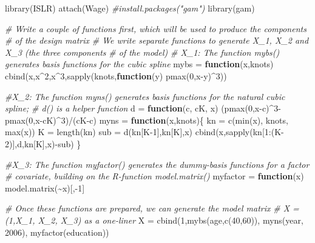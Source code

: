 \documentclass[
]{article}
\newenvironment{Shaded}{\begin{snugshade}}{\end{snugshade}}
\newcommand{\CommentTok}[1]{\textcolor[rgb]{0.56,0.35,0.01}{\textit{#1}}}
\newcommand{\ControlFlowTok}[1]{\textcolor[rgb]{0.13,0.29,0.53}{\textbf{#1}}}
\newcommand{\DecValTok}[1]{\textcolor[rgb]{0.00,0.00,0.81}{#1}}
\newcommand{\FunctionTok}[1]{\textcolor[rgb]{0.00,0.00,0.00}{#1}}
\newcommand{\NormalTok}[1]{#1}
\newcommand{\OtherTok}[1]{\textcolor[rgb]{0.56,0.35,0.01}{#1}}
\newcommand{\SpecialCharTok}[1]{\textcolor[rgb]{0.00,0.00,0.00}{#1}}
\begin{document}
\begin{Shaded}
\begin{Highlighting}[]
\FunctionTok{library}\NormalTok{(ISLR)}
\FunctionTok{attach}\NormalTok{(Wage)}
\CommentTok{\#install.packages("gam")}
\FunctionTok{library}\NormalTok{(gam)}

\CommentTok{\# Write a couple of functions first, which will be used to produce the components }
\CommentTok{\# of the design matrix}
\CommentTok{\# We write separate functions to generate X\_1, X\_2 and X\_3 (the three components }
\CommentTok{\# of the model)}
\CommentTok{\# X\_1: The function mybs() generates basis functions for the cubic spline}
\NormalTok{mybs }\OtherTok{=} \ControlFlowTok{function}\NormalTok{(x,knots) }\FunctionTok{cbind}\NormalTok{(x,x}\SpecialCharTok{\^{}}\DecValTok{2}\NormalTok{,x}\SpecialCharTok{\^{}}\DecValTok{3}\NormalTok{,}\FunctionTok{sapply}\NormalTok{(knots,}\ControlFlowTok{function}\NormalTok{(y) }\FunctionTok{pmax}\NormalTok{(}\DecValTok{0}\NormalTok{,x}\SpecialCharTok{{-}}\NormalTok{y)}\SpecialCharTok{\^{}}\DecValTok{3}\NormalTok{))}

\CommentTok{\#X\_2: The function myns() generates basis functions for the natural cubic spline;}
\CommentTok{\# d() is a helper function}
\NormalTok{d }\OtherTok{=} \ControlFlowTok{function}\NormalTok{(c, cK, x) (}\FunctionTok{pmax}\NormalTok{(}\DecValTok{0}\NormalTok{,x}\SpecialCharTok{{-}}\NormalTok{c)}\SpecialCharTok{\^{}}\DecValTok{3}\SpecialCharTok{{-}}\FunctionTok{pmax}\NormalTok{(}\DecValTok{0}\NormalTok{,x}\SpecialCharTok{{-}}\NormalTok{cK)}\SpecialCharTok{\^{}}\DecValTok{3}\NormalTok{)}\SpecialCharTok{/}\NormalTok{(cK}\SpecialCharTok{{-}}\NormalTok{c)}
\NormalTok{myns }\OtherTok{=} \ControlFlowTok{function}\NormalTok{(x,knots)\{}
\NormalTok{  kn }\OtherTok{=} \FunctionTok{c}\NormalTok{(}\FunctionTok{min}\NormalTok{(x), knots, }\FunctionTok{max}\NormalTok{(x))}
\NormalTok{  K }\OtherTok{=} \FunctionTok{length}\NormalTok{(kn)}
\NormalTok{  sub }\OtherTok{=} \FunctionTok{d}\NormalTok{(kn[K}\DecValTok{{-}1}\NormalTok{],kn[K],x)}
  \FunctionTok{cbind}\NormalTok{(x,}\FunctionTok{sapply}\NormalTok{(kn[}\DecValTok{1}\SpecialCharTok{:}\NormalTok{(K}\DecValTok{{-}2}\NormalTok{)],d,kn[K],x)}\SpecialCharTok{{-}}\NormalTok{sub)}
\NormalTok{\}}

\CommentTok{\#X\_3: The function myfactor() generates the dummy{-}basis functions for a factor }
\CommentTok{\# covariate, building on the R{-}function model.matrix()}
\NormalTok{myfactor }\OtherTok{=} \ControlFlowTok{function}\NormalTok{(x) }\FunctionTok{model.matrix}\NormalTok{(}\SpecialCharTok{\textasciitilde{}}\NormalTok{x)[,}\SpecialCharTok{{-}}\DecValTok{1}\NormalTok{]}

\CommentTok{\# Once these functions are prepared, we can generate the model matrix }
\CommentTok{\# X = (1,X\_1, X\_2, X\_3) as a one{-}liner }
\NormalTok{X }\OtherTok{=} \FunctionTok{cbind}\NormalTok{(}\DecValTok{1}\NormalTok{,}\FunctionTok{mybs}\NormalTok{(age,}\FunctionTok{c}\NormalTok{(}\DecValTok{40}\NormalTok{,}\DecValTok{60}\NormalTok{)), }\FunctionTok{myns}\NormalTok{(year, }\DecValTok{2006}\NormalTok{), }\FunctionTok{myfactor}\NormalTok{(education))}
\end{Highlighting}
\end{Shaded}
\end{document}
